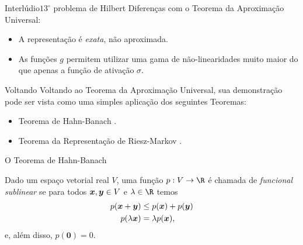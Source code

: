 \documentclass[13pt]{beamer}
\begin{document}
\begin{frame}{Interlúdio}{\( 13^{ \circ } \) problema de Hilbert}
    \vspace{2pt}
    Diferenças com o Teorema da Aproximação Universal:
    \begin{itemize}
        \item<1-> A representação é \emph{exata}, não aproximada.
        \item<2-> As funções \( g \) permitem utilizar uma gama de não-linearidades muito maior do que apenas a função de ativação \( \sigma \).
    \end{itemize}
\end{frame}



\begin{frame}{Voltando}
    Voltando ao Teorema da Aproximação Universal, sua demonstração pode ser vista como uma simples aplicação dos seguintes Teoremas:
    \begin{itemize}
        \item<2-> Teorema de Hahn-Banach \cite{func-anal}.
        \item<3-> Teorema da Representação de Riesz-Markov \cite{royden}.
    \end{itemize}
\end{frame}


\begin{frame}{O Teorema de Hahn-Banach}
    \begin{defn*}
        Dado um espaço vetorial real \( V \), uma função \( p : V \to \R \) é chamada de \emph{funcional sublinear} se para todos \( \bm{x}, \bm{y} \in V \) e \( \lambda \in \R \) temos
        \begin{align*}
            p ( \bm{x} + \bm{y} ) &\leq p ( \bm{x} ) + p ( \bm{y} ) \\
            p ( \lambda \bm{x} ) &= \lambda p ( \bm{x} )
        ,\end{align*}
        e, além disso, \( p ( \mathbf{0} ) = 0 \).
    \end{defn*}
\end{frame}
\end{document}
